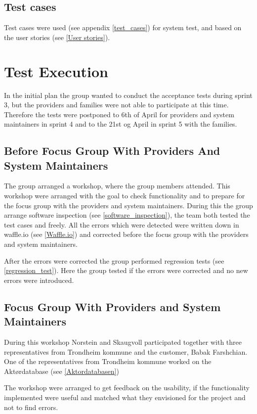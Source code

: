 \subsection{Test cases}
\label{Test cases}
Test cases were used (see appendix \ref{test_cases}) for system test, and based on the user stories (see \ref{User stories}).



\section{Test Execution}
In the initial plan the group wanted to conduct the acceptance tests during sprint 3, but the providers and families were not able to participate at this time. Therefore the tests were postponed to 6th of April for providers and system maintainers in sprint 4 and to the 21st og April in sprint 5 with the families.


\subsection{Before Focus Group With Providers And System Maintainers}
\label{before_focus_group_with_providers}
The group arranged a workshop, where the group members attended. This workshop were arranged with the goal to check functionality and to prepare for the focus group with the providers and system maintainers. During this the group arrange software inspection (see \ref{software_inspection}), the team both tested the test cases and freely. All the errors which were detected were written down in waffle.io (see \ref{Waffle.io}) and corrected before the focus group with the providers and system maintainers.

After the errors were corrected the group performed regression tests (see \ref{regression_test}). Here the group tested if the errors were corrected and no new errors were introduced.


\subsection{Focus Group With Providers and System Maintainers}
\label{focusGrouoProviders}
During this workshop Norstein and Skaugvoll participated together with three representatives from Trondheim kommune and the customer, Babak Farshchian. One of the representatives from Trondheim kommune worked on the Aktørdatabase (see \ref{Aktordatabasen})

The workshop were arranged to get feedback on the usability, if the functionality implemented were useful and matched what they envisioned for the project and not to find errors.

